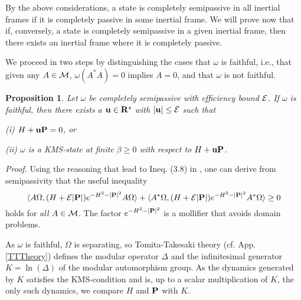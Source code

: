 \documentclass[a4paper,11pt]{article}
\newtheorem{proposition}[theorem]{Proposition}{\bf}{\it}
\def\dt{\cal}
\def\dM{{\dt M}}
\def\E{{\cal E}}
\def\gO{\Omega}
\def\go{\omega}
\def\reals{{\bf R}}
\begin{document}
By the above considerations, a state is completely
semipassive in all inertial frames if it is completely passive
in some inertial frame. We will prove now that if, conversely,
a state is completely semipassive in a given inertial frame, then there
exists an inertial frame where it is completely passive.

We proceed in
two steps by distinguishing the cases that $\go$ is faithful,
i.e., that given any $A\in\dM$, $\go(A^*A)=0$ implies $A=0$,
and that $\go$ is not faithful.
\begin{proposition}\label{rkms theorem}
Let $\go$ be completely semipassive with efficiency bound $\E$.
If $\go$ is faithful, then there exists a ${\bf u}\in\reals^s$
with $|{\bf u}|\leq\E$ such that

(i) $H+{\bf uP}=0$, or

(ii) $\go$ is a
KMS-state at finite $\beta\geq0$
with respect to $H+{\bf u}{\bf P}$.
\end{proposition}
{\it Proof.}
Using the reasoning that lead to Ineq.
(3.8) in \cite{PW78}, one can derive from semipassivity that the
useful inequality
\begin{equation}\label{windmill}
\langle A\gO,(H+\E|{\bf P}|) e^{-H^2-|{\bf P}|^2}A\gO\rangle
+\langle A^*\gO,(H+\E|{\bf P}|) e^{-H^2-|{\bf P}|^2}A^*\gO\rangle
\geq 0
\end{equation}
holds for {\it all} $A\in\dM$. The
factor $e^{-H^2-|{\bf P}|^2}$ is a mollifier that avoids domain problems.

As $\go$ is faithful, $\gO$ is separating, so Tomita-Takesaki theory
(cf. App. \ref{TTTheory}) defines the modular operator $\Delta$
and the infinitesimal generator $K=\ln(\Delta)$ of the modular automorphism
group. As the dynamics generated by $K$ satisfies the KMS-condition
and is, up to a scalar multiplication of $K$, the only such dynamics,
we compare $H$ and ${\bf P}$ with $K$.
\end{document}
